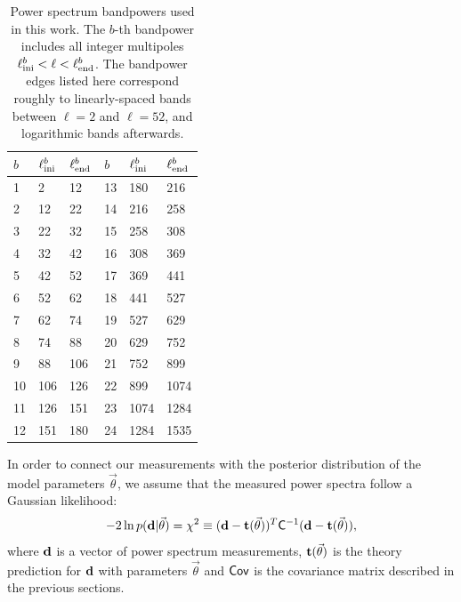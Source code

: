 \documentclass[useAMS,usenatbib]{mn2e}
\begin{document}
  \begin{table}
      \begin{center}
        \begin{tabular}{lll|lll}
          $b$ & $\ell^b_{\rm ini}$ & $\ell^b_{\rm end}$ & $b$ & $\ell^b_{\rm ini}$ & $\ell^b_{\rm end}$ \\[1ex]
          \hline
           1 &   2 &  12 &  13 &  180 &  216\\
           2 &  12 &  22 &  14 &  216 &  258\\
           3 &  22 &  32 &  15 &  258 &  308\\
           4 &  32 &  42 &  16 &  308 &  369\\
           5 &  42 &  52 &  17 &  369 &  441\\
           6 &  52 &  62 &  18 &  441 &  527\\
           7 &  62 &  74 &  19 &  527 &  629\\
           8 &  74 &  88 &  20 &  629 &  752\\
           9 &  88 & 106 &  21 &  752 &  899\\
          10 & 106 & 126 &  22 &  899 & 1074\\
          11 & 126 & 151 &  23 & 1074 & 1284\\
          12 & 151 & 180 &  24 & 1284 & 1535\\
          \hline
        \end{tabular}
        \caption{Power spectrum bandpowers used in this work. The $b$-th bandpower includes all integer multipoles $\ell^b_{\rm ini}<\ell<\ell^b_{\rm end}$. The bandpower edges listed here correspond roughly to linearly-spaced bands between $\ell=2$ and $\ell=52$, and logarithmic bands afterwards.}\label{tab:bpws}
      \end{center}
    \end{table} 
    In order to connect our measurements with the posterior distribution of the model parameters $\vec{\theta}$, we assume that the measured power spectra follow a Gaussian likelihood:
    \begin{equation}
      -2\ln p({\bf d}|\vec{\theta}) = \chi^2\equiv ({\bf d}-{\bf t}(\vec{\theta}))^T {\sf C}^{-1} ({\bf d}-{\bf t}(\vec{\theta})),
    \end{equation}
    where ${\bf d}$ is a vector of power spectrum measurements, ${\bf t}(\vec{\theta})$ is the theory prediction for ${\bf d}$ with parameters $\vec{\theta}$ and ${\sf Cov}$ is the covariance matrix described in the previous sections.
\end{document}
